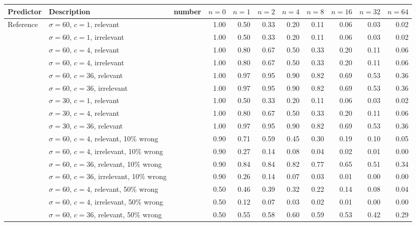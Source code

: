 \begin{tabular}{llrrrrrrrrr}
\toprule
Predictor & Description & number & $n = 0$ & $n = 1$ & $n = 2$ & $n = 4$ & $n = 8$ & $n = 16$ & $n = 32$ & $n = 64$ \\
\midrule
Reference & $\sigma = 60$, $c = 1$, relevant &  & 1.00 & 0.50 & 0.33 & 0.20 & 0.11 & 0.06 & 0.03 & 0.02 \\
 & $\sigma = 60$, $c = 1$, irrelevant &  & 1.00 & 0.50 & 0.33 & 0.20 & 0.11 & 0.06 & 0.03 & 0.02 \\
 & $\sigma = 60$, $c = 4$, relevant &  & 1.00 & 0.80 & 0.67 & 0.50 & 0.33 & 0.20 & 0.11 & 0.06 \\
 & $\sigma = 60$, $c = 4$, irrelevant &  & 1.00 & 0.80 & 0.67 & 0.50 & 0.33 & 0.20 & 0.11 & 0.06 \\
 & $\sigma = 60$, $c = 36$, relevant &  & 1.00 & 0.97 & 0.95 & 0.90 & 0.82 & 0.69 & 0.53 & 0.36 \\
 & $\sigma = 60$, $c = 36$, irrelevant &  & 1.00 & 0.97 & 0.95 & 0.90 & 0.82 & 0.69 & 0.53 & 0.36 \\
 & $\sigma = 30$, $c = 1$, relevant &  & 1.00 & 0.50 & 0.33 & 0.20 & 0.11 & 0.06 & 0.03 & 0.02 \\
 & $\sigma = 30$, $c = 4$, relevant &  & 1.00 & 0.80 & 0.67 & 0.50 & 0.33 & 0.20 & 0.11 & 0.06 \\
 & $\sigma = 30$, $c = 36$, relevant &  & 1.00 & 0.97 & 0.95 & 0.90 & 0.82 & 0.69 & 0.53 & 0.36 \\
 & $\sigma = 60$, $c = 4$, relevant, 10\% wrong &  & 0.90 & 0.71 & 0.59 & 0.45 & 0.30 & 0.19 & 0.10 & 0.05 \\
 & $\sigma = 60$, $c = 4$, irrelevant, 10\% wrong &  & 0.90 & 0.27 & 0.14 & 0.08 & 0.04 & 0.02 & 0.01 & 0.00 \\
 & $\sigma = 60$, $c = 36$, relevant, 10\% wrong &  & 0.90 & 0.84 & 0.84 & 0.82 & 0.77 & 0.65 & 0.51 & 0.34 \\
 & $\sigma = 60$, $c = 36$, irrelevant, 10\% wrong &  & 0.90 & 0.26 & 0.14 & 0.07 & 0.03 & 0.01 & 0.00 & 0.00 \\
 & $\sigma = 60$, $c = 4$, relevant, 50\% wrong &  & 0.50 & 0.46 & 0.39 & 0.32 & 0.22 & 0.14 & 0.08 & 0.04 \\
 & $\sigma = 60$, $c = 4$, irrelevant, 50\% wrong &  & 0.50 & 0.12 & 0.07 & 0.03 & 0.02 & 0.01 & 0.00 & 0.00 \\
 & $\sigma = 60$, $c = 36$, relevant, 50\% wrong &  & 0.50 & 0.55 & 0.58 & 0.60 & 0.59 & 0.53 & 0.42 & 0.29 \\

\end{tabular}
